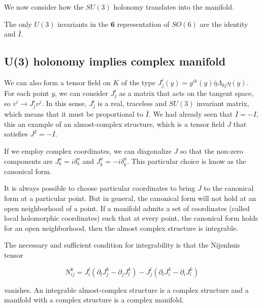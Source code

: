
We now consider how the $SU(3)$ holonomy translates into the manifold. 


The only  $U(3)$ invariants in the $\mathbf{6}$ representation of $SO(6)$ are the identity and
$\bar I$.

\subsection{U(3) holonomy implies complex manifold}

We can also form a tensor field on $K$ of the type $J^i_j(y)=g^{ik}(y) \bar\eta \Lambda_{kj} \eta(y)$.
For each point $y$, we can consider $J^i_j$ as a matrix that acts on the tangent space, so $v^i \to J^i_j v^j$.
In this sense, $J^i_j$ is a real, traceless and $SU(3)$ invariant matrix, which means that it must be proportional
to $\bar I$.
We had already seen that $\bar I = -I$, this an example of an almost-complex structure, which is 
a tensor field $J$ that satisfies $J^2=-I$.

If we employ complex coordinates, we can diagonalize $J$ so that the non-zero components are
$J^a_b=i\delta^a_b$ and $J^{\bar a}_{\bar b}=-i\delta^{\bar a}_{\bar b}$. This particular choice
is know as the canonical form.



It is always possible to choose particular coordinates to bring $J$ to the canonical form at a particular 
point.
But in general, the canonical form will not hold at an open neighborhood of a point.
If a manifold admits a set of coordinates (called local holomorphic coordinates) such that at every
point, the canonical form holds for an open neighborhood, then the almost complex structure is integrable.

The necessary and sufficient condition for integrability is that the Nijenhuis tensor

\begin{equation}
  N^k_{ij}= J^l_i(\partial_l J^k_j - \partial_j J^k_l) - J_j^l (\partial_l J^k_i - \partial_i J^k_l)
\end{equation}

vanishes.
An integrable almost-complex structure is a complex structure and a manifold with a complex structure
is a complex manifold.


